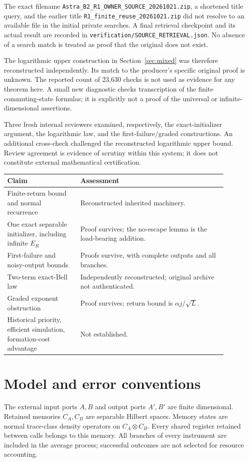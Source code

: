 \documentclass[11pt,a4paper]{article}
\numberwithin{equation}{section}
\theoremstyle{remark}
\newcommand{\ER}{E_R}
\begin{document}
The exact filename
\texttt{Astra\_B2\_R1\_OWNER\_SOURCE\_20261021.zip}, a shortened title query,
and the earlier title \texttt{R1\_finite\_reuse\_20261021.zip} did not resolve
to an available file in the initial private searches. A final retrieval
checkpoint and its actual result are recorded in
\texttt{verification/SOURCE\_RETRIEVAL.json}. No absence of a search match is
treated as proof that the original does not exist.

The logarithmic upper construction in Section~\ref{sec:mixed} was therefore
reconstructed independently. Its match to the producer's specific original
proof is unknown. The reported count of 23,630 checks is not used as
evidence for any theorem here. A small new diagnostic checks transcription
of the finite commuting-state formulas; it is explicitly not a proof of the
universal or infinite-dimensional assertions.

Three fresh internal reviewers examined, respectively, the exact-initializer
argument, the logarithmic law, and the first-failure/graded constructions.
An additional cross-check challenged the reconstructed logarithmic upper
bound. Review agreement is evidence of scrutiny within this system; it does
not constitute external mathematical certification.

\begin{center}
\begin{tabular}{p{0.30\linewidth}p{0.60\linewidth}}
\toprule
Claim & Assessment\\
\midrule
Finite-return bound and normal recurrence & Reconstructed inherited machinery.\\
One exact separable initializer, including infinite \(\ER\) &
Proof survives; the no-escape lemma is the load-bearing addition.\\
First-failure and noisy-output bounds & Proofs survive, with complete outputs and all branches.\\
Two-term exact-Bell law & Independently reconstructed; original archive not authenticated.\\
Graded exponent obstruction & Proof survives; return bound is \(\alpha j/\sqrt L\).\\
Historical priority, efficient simulation, formation-cost advantage &
Not established.\\
\bottomrule
\end{tabular}
\end{center}

\section{Model and error conventions}\label{sec:model}
The external input ports \(A,B\) and output ports \(A',B'\) are
finite dimensional. Retained memories \(C_A,C_B\) are separable Hilbert
spaces. Memory states are normal trace-class density operators on
\(C_A\otimes C_B\). Every shared register retained between calls belongs
to this memory. All branches of every instrument are included in the
average process; successful outcomes are not selected for resource accounting.
\end{document}
